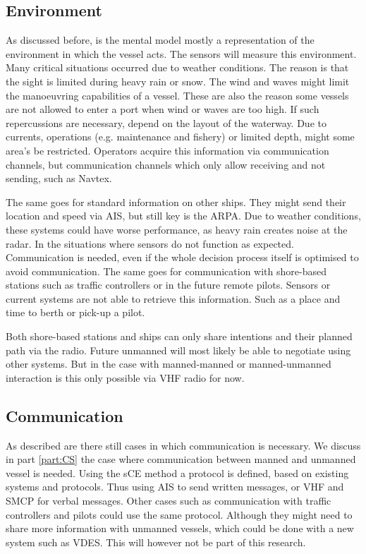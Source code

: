 \subsection{Environment}
As discussed before, is the mental model mostly a representation of the environment in which the vessel acts. The sensors will measure this environment. Many critical situations occurred due to weather conditions. The reason is that the sight is limited during heavy rain or snow. The wind and waves might limit the manoeuvring capabilities of a vessel. These are also the reason some vessels are not allowed to enter a port when wind or waves are too high.
If such repercussions are necessary, depend on the layout of the waterway. Due to currents, operations (e.g. maintenance and fishery) or limited depth, might some area's be restricted. Operators acquire this information via communication channels, but communication channels which only allow receiving and not sending, such as \acf{Navtex}.

The same goes for standard information on other ships. They might send their location and speed via \ac{AIS}, but still key is the \ac{ARPA}. Due to weather conditions, these systems could have worse performance, as heavy rain creates noise at the radar. In the situations where sensors do not function as expected. Communication is needed, even if the whole decision process itself is optimised to avoid communication.
The same goes for communication with shore-based stations such as traffic controllers or in the future remote pilots. Sensors or current systems are not able to retrieve this information. Such as a place and time to berth or pick-up a pilot.

Both shore-based stations and ships can only share intentions and their planned path via the radio. Future unmanned will most likely be able to negotiate using other systems. But in the case with manned-manned or manned-unmanned interaction is this only possible via \ac{VHF} radio for now.

\subsection{Communication}
As described are there still cases in which communication is necessary. We discuss in part \ref{part:CS} the case where communication between manned and unmanned vessel is needed. Using the \acf{sCE} method a protocol is defined, based on existing systems and protocols. Thus using \ac{AIS} to send written messages, or \ac{VHF} and \ac{SMCP} for verbal messages. 
Other cases such as communication with traffic controllers and pilots could use the same protocol. Although they might need to share more information with unmanned vessels, which could be done with a new system such as \ac{VDES}. This will however not be part of this research.
